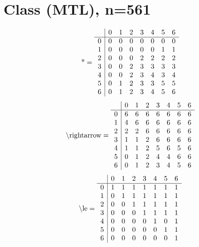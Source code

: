 \documentclass[11pt]{article}
\begin{document}
\section{Class (MTL), n=561}
\[\text{*} = 
\begin{array}{r | r r r r r r r}
 & 0 & 1 & 2 & 3 & 4 & 5 & 6 \\ \hline
0 & 0 & 0 & 0 & 0 & 0 & 0 & 0 \\
1 & 0 & 0 & 0 & 0 & 0 & 1 & 1 \\
2 & 0 & 0 & 0 & 2 & 2 & 2 & 2 \\
3 & 0 & 0 & 2 & 3 & 3 & 3 & 3 \\
4 & 0 & 0 & 2 & 3 & 4 & 3 & 4 \\
5 & 0 & 1 & 2 & 3 & 3 & 5 & 5 \\
6 & 0 & 1 & 2 & 3 & 4 & 5 & 6 \\
\end{array}
\]
\[\text{\textbackslash rightarrow} = 
\begin{array}{r | r r r r r r r}
 & 0 & 1 & 2 & 3 & 4 & 5 & 6 \\ \hline
0 & 6 & 6 & 6 & 6 & 6 & 6 & 6 \\
1 & 4 & 6 & 6 & 6 & 6 & 6 & 6 \\
2 & 2 & 2 & 6 & 6 & 6 & 6 & 6 \\
3 & 1 & 1 & 2 & 6 & 6 & 6 & 6 \\
4 & 1 & 1 & 2 & 5 & 6 & 5 & 6 \\
5 & 0 & 1 & 2 & 4 & 4 & 6 & 6 \\
6 & 0 & 1 & 2 & 3 & 4 & 5 & 6 \\
\end{array}
\]
\[\text{\textbackslash le} = 
\begin{array}{r | r r r r r r r}
 & 0 & 1 & 2 & 3 & 4 & 5 & 6 \\ \hline
0 & 1 & 1 & 1 & 1 & 1 & 1 & 1 \\
1 & 0 & 1 & 1 & 1 & 1 & 1 & 1 \\
2 & 0 & 0 & 1 & 1 & 1 & 1 & 1 \\
3 & 0 & 0 & 0 & 1 & 1 & 1 & 1 \\
4 & 0 & 0 & 0 & 0 & 1 & 0 & 1 \\
5 & 0 & 0 & 0 & 0 & 0 & 1 & 1 \\
6 & 0 & 0 & 0 & 0 & 0 & 0 & 1 \\
\end{array}
\]
\end{document}
